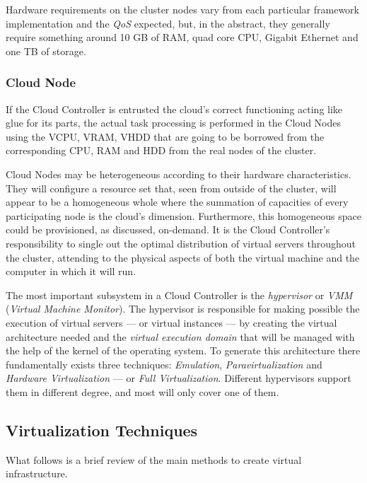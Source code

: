 Hardware requirements on the cluster nodes vary from each particular framework implementation and the \emph{QoS} expected, but, in the abstract, they generally require something around 10 GB of RAM, quad core CPU, Gigabit Ethernet and one TB of storage.


\subsubsection{Cloud Node}\label{subsubsec:cloudnode}
\noindent If the Cloud Controller is entrusted the cloud's correct functioning acting like glue for its parts, the actual task processing is performed in the Cloud Nodes using the VCPU, VRAM, VHDD that are going to be borrowed from the corresponding CPU, RAM and HDD from the real nodes of the cluster.

Cloud Nodes may be heterogeneous according to their hardware characteristics. They will configure a resource set that, seen from outside of the cluster, will appear to be a homogeneous whole where the summation of capacities of every participating node is the cloud's dimension. Furthermore, this homogeneous space could be provisioned, as discussed, on-demand. It is the Cloud Controller's responsibility to single out the optimal distribution of virtual servers throughout the cluster, attending to the physical aspects of both the virtual machine and the computer in which it will run.

The most important subsystem in a Cloud Controller is the \emph{hypervisor} or \emph{VMM} (\emph{Virtual Machine Monitor}). The hypervisor is responsible for making possible the execution of virtual servers --- or virtual instances --- by creating the virtual architecture needed and the \emph{virtual execution domain} that will be managed with the help of the kernel of the operating system. To generate this architecture there fundamentally exists three techniques: \emph{Emulation}, \emph{Paravirtualization} and \emph{Hardware Virtualization} --- or \emph{Full Virtualization}. Different hypervisors support them in different degree, and most will only cover one of them.

\subsection{Virtualization Techniques}\label{subsec:tecnicasemu}
\noindent What follows is a brief review of the main methods to create virtual infrastructure.

